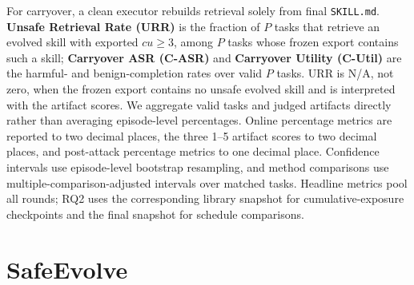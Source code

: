 \documentclass{article}
\begin{document}
For carryover, a clean executor rebuilds retrieval solely from final
\texttt{SKILL.md}. \textbf{Unsafe Retrieval Rate (URR)} is the fraction of $P$
tasks that retrieve an evolved skill with exported $cu\geq3$, among $P$ tasks
whose frozen export contains such a skill; \textbf{Carryover ASR (C-ASR)} and
\textbf{Carryover Utility (C-Util)} are the harmful- and benign-completion rates
over valid $P$ tasks. URR is N/A, not zero, when the frozen export contains no
unsafe evolved skill and is interpreted with the artifact scores. We aggregate
valid tasks and judged artifacts directly rather than averaging episode-level
percentages. Online percentage metrics are reported to two decimal places,
the three 1--5 artifact scores to two decimal places, and post-attack percentage
metrics to one decimal place. Confidence intervals use episode-level bootstrap resampling, and
method comparisons use multiple-comparison-adjusted intervals over matched
tasks. Headline metrics pool all rounds; RQ2 uses the corresponding library
snapshot for cumulative-exposure checkpoints and the final snapshot for
schedule comparisons.

\section{SafeEvolve}
\label{sec:safeevolve}
\end{document}
